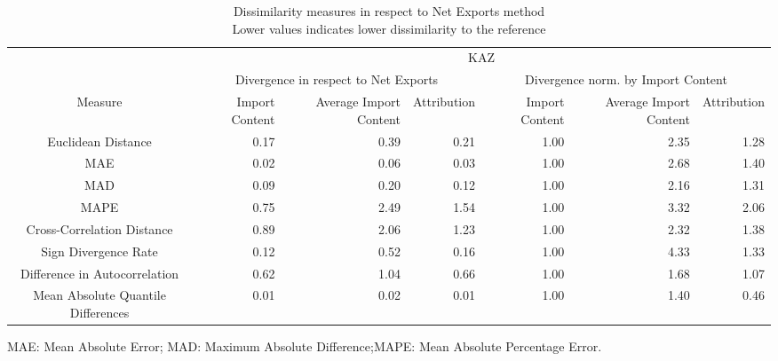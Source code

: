 \begin{table}[t]
\caption*{
{\large Dissimilarity measures in respect to Net Exports method} \\ 
{\small Lower values indicates lower dissimilarity to the reference}
} 
\fontsize{15.0pt}{18.0pt}\selectfont
\begin{tabular*}{\linewidth}{@{\extracolsep{\fill}}crrrrrr}
\toprule
 & \multicolumn{6}{c}{KAZ} \\ 
\cmidrule(lr){2-7}
 & \multicolumn{3}{c}{Divergence in respect to Net Exports} & \multicolumn{3}{c}{Divergence norm. by Import Content} \\ 
\cmidrule(lr){2-4} \cmidrule(lr){5-7}
Measure & Import Content & Average Import Content & Attribution & Import Content & Average Import Content & Attribution \\ 
\midrule\addlinespace[2.5pt]
Euclidean Distance & 0.17 & 0.39 & 0.21 & 1.00 & 2.35 & 1.28 \\ 
MAE & 0.02 & 0.06 & 0.03 & 1.00 & 2.68 & 1.40 \\ 
MAD & 0.09 & 0.20 & 0.12 & 1.00 & 2.16 & 1.31 \\ 
MAPE & 0.75 & 2.49 & 1.54 & 1.00 & 3.32 & 2.06 \\ 
Cross-Correlation Distance & 0.89 & 2.06 & 1.23 & 1.00 & 2.32 & 1.38 \\ 
Sign Divergence Rate & 0.12 & 0.52 & 0.16 & 1.00 & 4.33 & 1.33 \\ 
Difference in Autocorrelation & 0.62 & 1.04 & 0.66 & 1.00 & 1.68 & 1.07 \\ 
Mean Absolute Quantile Differences & 0.01 & 0.02 & 0.01 & 1.00 & 1.40 & 0.46 \\ 
\bottomrule
\end{tabular*}
\begin{minipage}{\linewidth}
MAE: Mean Absolute Error; MAD: Maximum Absolute Difference;MAPE: Mean Absolute Percentage Error.\\
\end{minipage}
\end{table}

